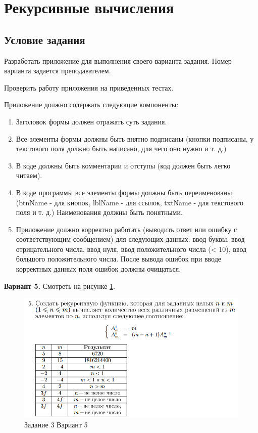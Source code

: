 \section{Рекурсивные вычисления}

\subsection{Условие задания}

Разработать приложение для выполнения своего варианта задания. Номер варианта задается преподавателем.

Проверить работу приложения на приведенных тестах.

Приложение должно содержать следующие компоненты:

\begin{enumerate}
    \item Заголовок формы должен отражать суть задания.
    \item Все элементы формы должны быть внятно подписаны (кнопки подписаны, у текстового поля должно быть написано, для чего оно нужно и т. д.)
    \item В коде должны быть комментарии и отступы (код должен быть легко читаем).
    \item В коде программы все элементы формы должны быть переименованы (btnName -  для кнопок, lblName - для ссылок, txtName - для текстового поля и т. д.) Наименования должны быть понятными.
    \item Приложение должно корректно работать (выводить ответ или ошибку с соответствующим сообщением) для следующих данных: ввод буквы, ввод отрицательного числа, ввод нуля, ввод положительного числа (< 10), ввод большого положительного числа. После вывода ошибок при вводе корректных данных поля ошибок должны очищаться.
\end{enumerate}

\textbf{Вариант 5.} Смотреть на рисунке \ref{task3_var5}.
\begin{figure}[H]
    \centering
    \includegraphics[width=0.9\linewidth]{lections/img/task3_var5.png}
    \caption{Задание 3 Вариант 5}
    \label{task3_var5}
\end{figure}

